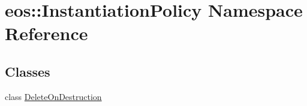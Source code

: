 \hypertarget{namespaceeos_1_1InstantiationPolicy}{
\section{eos::InstantiationPolicy Namespace Reference}
\label{namespaceeos_1_1InstantiationPolicy}
}
\subsection*{Classes}
\begin{DoxyCompactItemize}
\item 
class \hyperlink{classeos_1_1InstantiationPolicy_1_1DeleteOnDestruction}{DeleteOnDestruction}
\end{DoxyCompactItemize}
